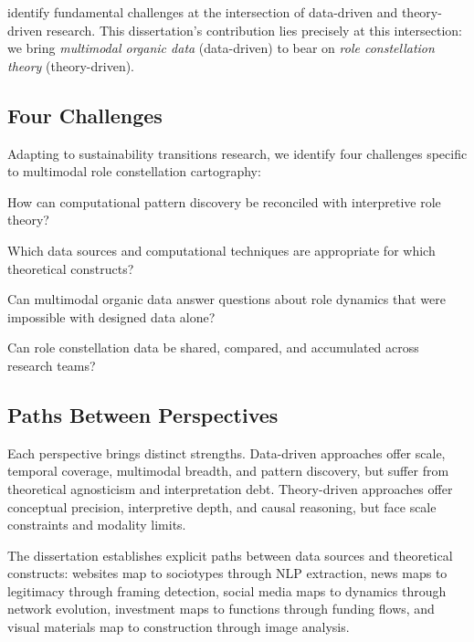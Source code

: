 \documentclass[../main.tex]{subfiles}
\begin{document}
\textcite{maass2018data} identify fundamental challenges at the intersection of data-driven and theory-driven research. This dissertation's contribution lies precisely at this intersection: we bring \emph{multimodal organic data} (data-driven) to bear on \emph{role constellation theory} (theory-driven).

\subsection{Four Challenges}

Adapting \textcite{maass2018data} to sustainability transitions research, we identify four challenges specific to multimodal role constellation cartography:

\begin{description}[leftmargin=0.5cm, itemsep=0.3em]
\item[C1: Reconciling analytical approaches.] How can computational pattern discovery be reconciled with interpretive role theory?
\item[C2: Selecting data and techniques.] Which data sources and computational techniques are appropriate for which theoretical constructs?
\item[C3: Addressing previously intractable problems.] Can multimodal organic data answer questions about role dynamics that were impossible with designed data alone?
\item[C4: Enabling cumulative research.] Can role constellation data be shared, compared, and accumulated across research teams?
\end{description}

\subsection{Paths Between Perspectives}

Each perspective brings distinct strengths. Data-driven approaches offer scale, temporal coverage, multimodal breadth, and pattern discovery, but suffer from theoretical agnosticism and interpretation debt. Theory-driven approaches offer conceptual precision, interpretive depth, and causal reasoning, but face scale constraints and modality limits.

The dissertation establishes explicit paths between data sources and theoretical constructs: websites map to sociotypes through NLP extraction, news maps to legitimacy through framing detection, social media maps to dynamics through network evolution, investment maps to functions through funding flows, and visual materials map to construction through image analysis.
\end{document}
